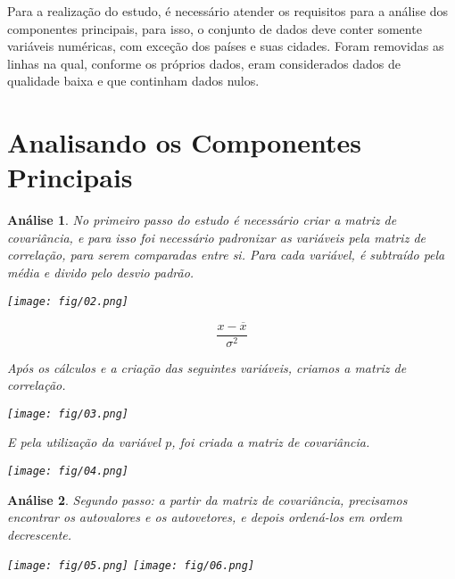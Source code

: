 \documentclass[11pt,a4paper]{article}
\newtheorem{2}{Análise}
\begin{document}
Para a realização do estudo, é necessário atender os requisitos para a análise dos componentes principais, para isso, o conjunto de dados deve conter somente variáveis numéricas, com exceção dos países e suas cidades. Foram removidas as linhas na qual, conforme os próprios dados, eram considerados dados de qualidade baixa e que continham dados nulos.


\section{Analisando os Componentes Principais}

\begin{2} \normalfont No primeiro passo do estudo é necessário criar a matriz de covariância, e para isso foi necessário padronizar as variáveis pela matriz de correlação, para serem comparadas entre si. Para cada variável, é subtraído pela média e divido pelo desvio padrão.

\begin{minipage}{.7\linewidth}
\begin{left}
    \texttt{[image: fig/02.png]}
\end{left}
\end{minipage}
\begin{minipage}{.3\linewidth}
\begin{equation}
\frac{x - \overline{x}}{\sigma^2}
\end{equation}
\end{minipage}

Após os cálculos e a criação das seguintes variáveis, criamos a matriz de correlação.

\begin{center}
    \texttt{[image: fig/03.png]}
\end{center}

E pela utilização da variável $p$, foi criada a matriz de covariância.

\begin{center}
    \texttt{[image: fig/04.png]}
\end{center}
\end{2}

\begin{2} \normalfont Segundo passo: a partir da matriz de covariância, precisamos encontrar os autovalores e os autovetores, e depois ordená-los em ordem decrescente.

\begin{center}
    \texttt{[image: fig/05.png]}
    \texttt{[image: fig/06.png]}
\end{center}
\end{2}
\end{document}
